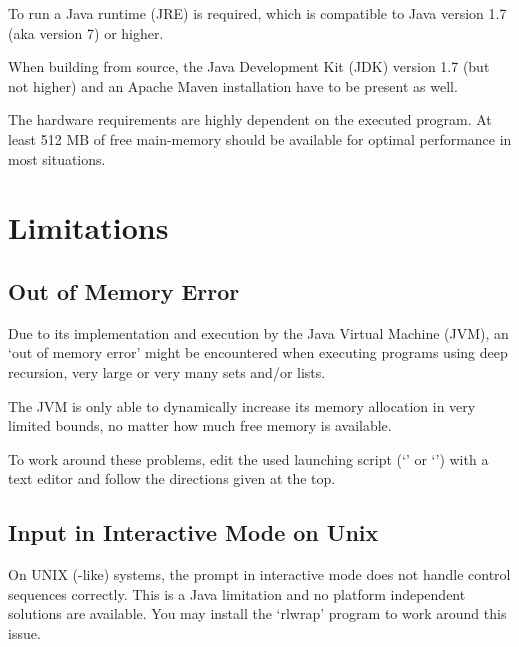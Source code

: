 To run \setlX{} a Java runtime (JRE) is required, which is compatible to Java version 1.7 (aka version 7) or higher.

When building from source, the Java Development Kit (JDK) version 1.7 (but not higher) and an Apache Maven installation have to be present as well.

The hardware requirements are highly dependent on the executed \SetlX{} program. At least 512 MB of free main-memory should be available for optimal performance in most situations.

\section{Limitations}

\subsection{Out of Memory Error}

Due to its implementation and execution by the Java Virtual Machine (JVM), an `out of memory error' might be encountered when executing \SetlX{} programs using deep recursion, very large or very many sets and\slash{}or lists.

The JVM is only able to dynamically increase its memory allocation in very limited bounds, no matter how much free memory is available.

To work around these problems, edit the used launching script (`' or `') with a text editor and follow the directions given at the top.

\subsection{Input in Interactive Mode on Unix}

On UNIX (-like) systems, the prompt in interactive mode does not handle control sequences correctly. This is a Java limitation and no platform independent solutions are available. You may install the `rlwrap' program to work around this issue.

%

